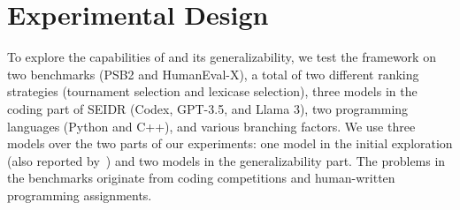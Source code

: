 \section{Experimental Design}
\label{sec:seidr-eval}

To explore the capabilities of \method{} and its generalizability, we test the framework on two benchmarks (PSB2 and
HumanEval-X), a total of two different ranking strategies (tournament selection and lexicase selection),
three models in the coding part of SEIDR (Codex, GPT-3.5, and Llama 3), two programming languages (Python and C++), and various branching factors.
We use three models over the two parts of our experiments: one model in the initial exploration (also reported by~\cite{liventsev2023:fully}) and two models in the generalizability part.
The problems in the benchmarks originate from coding competitions and human-written programming assignments. 

